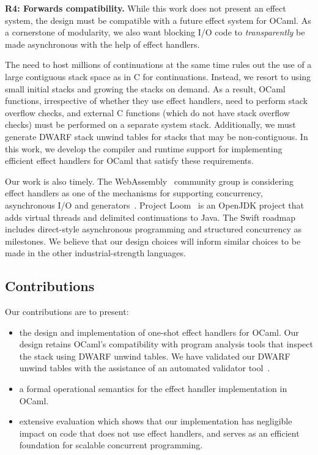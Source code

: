 \documentclass[sigplan,10pt,review,anonymous]{acmart}\settopmatter{printfolios=true,printccs=false,printacmref=false}
\begin{document}
\noindent \textbf{R4: Forwards compatibility.} While this work does not present an
effect system, the design must be compatible with a future effect system for
OCaml. As a cornerstone of modularity, we also want blocking I/O code to
\emph{transparently} be made asynchronous with the help of effect handlers.

The need to host millions of continuations at the same time rules out the use
of a large contiguous stack space as in C for continuations. Instead, we resort
to using small initial stacks and growing the stacks on demand. As a result,
OCaml functions, irrespective of whether they use effect handlers, need to
perform stack overflow checks, and external C functions (which do not have stack
overflow checks) must be performed on a separate system stack. Additionally, we
must generate DWARF stack unwind tables for stacks that may be non-contiguous.
In this work, we develop the compiler and runtime support for implementing
efficient effect handlers for OCaml that satisfy these requirements.

Our work is also timely. The WebAssembly~\cite{Hass17} community group is
considering effect handlers as one of the mechanisms for supporting
concurrency, asynchronous I/O and generators~\cite{WasmProposal}. Project
Loom~\cite{loom} is an OpenJDK project that adds virtual threads and delimited
continuations to Java. The Swift roadmap~\cite{swift} includes
direct-style asynchronous programming and structured concurrency as milestones.
We believe that our design choices will inform similar choices to be made in the
other industrial-strength languages.

\subsection{Contributions}

Our contributions are to present:

\begin{itemize}
  \item the design and implementation of one-shot effect handlers for OCaml.
    Our design retains OCaml's compatibility with program analysis tools that
    inspect the stack using DWARF unwind tables. We have validated our DWARF
    unwind tables with the assistance of an automated validator
    tool~\cite{Bastian19}.
  \item a formal operational semantics for the effect handler implementation in
    OCaml.
	\item extensive evaluation which shows that our implementation has negligible
		impact on code that does not use effect handlers, and serves as an
		efficient foundation for scalable concurrent programming.
\end{itemize}
\end{document}

